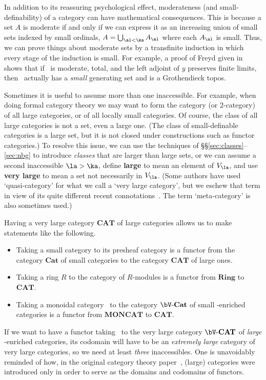 \documentclass{amsart}
\begin{document}
\begin{eg}
  In addition to its reassuring psychological effect, moderateness
  (and small-definability) of a category can have mathematical
  consequences.  This is because a set $A$ is moderate if and only if
  we can express it as an increasing union of small sets indexed by
  small ordinals, $A = \bigcup_{\al<\ka} A_\al$ where each $A_\al$ is
  small.  Thus, we can prove things about moderate sets by a
  transfinite induction in which every stage of the induction is
  small.  For example, a proof of Freyd given in~\cite{street:topos}
  shows that if \bA\ is moderate, total, and the left adjoint of $y$
  preserves finite limits, then \bA\ actually has a \emph{small}
  generating set and is a Grothendieck topos.
\end{eg}

Sometimes it is useful to assume more than one inaccessible.  For
example, when doing formal category theory we may want to form the
category (or 2-category) of all large categories, or of all locally
small categories.  Of course, the class of all large categories is not
a set, even a large one.  (The class of small-definable categories is
a large set, but it is not closed under constructions such as functor
categories.)  To resolve this issue, we can use the techniques of
\S\S\ref{sec:classes}--\ref{sec:nbg} to introduce \emph{classes} that
are larger than large sets, or we can assume a second inaccessible
$\la>\ka$, define \textbf{large} to mean an element of $V_\la$, and
use \textbf{very large} to mean a set not necessarily in $V_\la$.
(Some authors have used `quasi-category' for what we call a `very
large category', but we eschew that term in view of its quite
different recent connotations~\cite{joyal:q_kan}.  The term
`meta-category' is also sometimes used.)

Having a very large category $\mathbf{CAT}$ of large categories allows
us to make statements like the following.
\begin{itemize}
\item Taking a small category to its presheaf category is a functor
  from the category $\mathbf{Cat}$ of small categories to the category
  $\mathbf{CAT}$ of large ones.
\item Taking a ring $R$ to the category of $R$-modules is a functor
  from $\mathbf{Ring}$ to $\mathbf{CAT}$.
\item Taking a monoidal category \bV\ to the category
  $\bV\text{-}\mathbf{Cat}$ of small \bV-enriched categories is a
  functor from $\mathbf{MONCAT}$ to $\mathbf{CAT}$.
\end{itemize}
If we want to have a functor taking \bV\ to the very large category
$\bV\text{-}\mathbf{CAT}$ of \emph{large} \bV-enriched categories, its
codomain will have to be an \emph{extremely large} category of very
large categories, so we need at least \emph{three} inaccessibles.  One
is unavoidably reminded of how, in the original category theory
paper~\cite{em:first-ct}, (large) categories were introduced only in
order to serve as the domains and codomains of functors.
\end{document}
